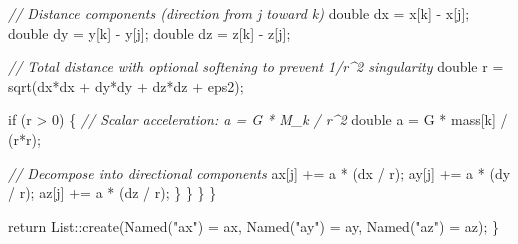 \documentclass[
  10.5pt,
  letterpaper,
]{scrbook}
\newenvironment{Shaded}{\begin{snugshade}}{\end{snugshade}}
\newcommand{\CommentTok}[1]{\textcolor[rgb]{0.00,0.00,0.00}{\textit{#1}}}
\newcommand{\ControlFlowTok}[1]{\textcolor[rgb]{0.00,0.00,0.00}{#1}}
\newcommand{\DataTypeTok}[1]{\textcolor[rgb]{0.00,0.00,0.00}{#1}}
\newcommand{\DecValTok}[1]{\textcolor[rgb]{0.00,0.00,0.00}{#1}}
\newcommand{\NormalTok}[1]{\textcolor[rgb]{0.00,0.00,0.00}{#1}}
\newcommand{\OperatorTok}[1]{\textcolor[rgb]{0.00,0.00,0.00}{#1}}
\newcommand{\StringTok}[1]{\textcolor[rgb]{0.00,0.00,0.00}{#1}}
\theoremstyle{definition}
\theoremstyle{plain}
\theoremstyle{remark}
\begin{document}
\begin{Shaded}
\begin{Highlighting}[]
        \CommentTok{// Distance components (direction from j toward k)}
        \DataTypeTok{double}\NormalTok{ dx }\OperatorTok{=}\NormalTok{ x}\OperatorTok{[}\NormalTok{k}\OperatorTok{]} \OperatorTok{{-}}\NormalTok{ x}\OperatorTok{[}\NormalTok{j}\OperatorTok{];}
        \DataTypeTok{double}\NormalTok{ dy }\OperatorTok{=}\NormalTok{ y}\OperatorTok{[}\NormalTok{k}\OperatorTok{]} \OperatorTok{{-}}\NormalTok{ y}\OperatorTok{[}\NormalTok{j}\OperatorTok{];}
        \DataTypeTok{double}\NormalTok{ dz }\OperatorTok{=}\NormalTok{ z}\OperatorTok{[}\NormalTok{k}\OperatorTok{]} \OperatorTok{{-}}\NormalTok{ z}\OperatorTok{[}\NormalTok{j}\OperatorTok{];}

        \CommentTok{// Total distance with optional softening to prevent 1/r\^{}2 singularity}
        \DataTypeTok{double}\NormalTok{ r }\OperatorTok{=}\NormalTok{ sqrt}\OperatorTok{(}\NormalTok{dx}\OperatorTok{*}\NormalTok{dx }\OperatorTok{+}\NormalTok{ dy}\OperatorTok{*}\NormalTok{dy }\OperatorTok{+}\NormalTok{ dz}\OperatorTok{*}\NormalTok{dz }\OperatorTok{+}\NormalTok{ eps2}\OperatorTok{);}

        \ControlFlowTok{if} \OperatorTok{(}\NormalTok{r }\OperatorTok{\textgreater{}} \DecValTok{0}\OperatorTok{)} \OperatorTok{\{}
          \CommentTok{// Scalar acceleration: a = G * M\_k / r\^{}2}
          \DataTypeTok{double}\NormalTok{ a }\OperatorTok{=}\NormalTok{ G }\OperatorTok{*}\NormalTok{ mass}\OperatorTok{[}\NormalTok{k}\OperatorTok{]} \OperatorTok{/} \OperatorTok{(}\NormalTok{r}\OperatorTok{*}\NormalTok{r}\OperatorTok{);}

          \CommentTok{// Decompose into directional components}
\NormalTok{          ax}\OperatorTok{[}\NormalTok{j}\OperatorTok{]} \OperatorTok{+=}\NormalTok{ a }\OperatorTok{*} \OperatorTok{(}\NormalTok{dx }\OperatorTok{/}\NormalTok{ r}\OperatorTok{);}
\NormalTok{          ay}\OperatorTok{[}\NormalTok{j}\OperatorTok{]} \OperatorTok{+=}\NormalTok{ a }\OperatorTok{*} \OperatorTok{(}\NormalTok{dy }\OperatorTok{/}\NormalTok{ r}\OperatorTok{);}
\NormalTok{          az}\OperatorTok{[}\NormalTok{j}\OperatorTok{]} \OperatorTok{+=}\NormalTok{ a }\OperatorTok{*} \OperatorTok{(}\NormalTok{dz }\OperatorTok{/}\NormalTok{ r}\OperatorTok{);}
        \OperatorTok{\}}
      \OperatorTok{\}}
    \OperatorTok{\}}
  \OperatorTok{\}}

  \ControlFlowTok{return}\NormalTok{ List}\OperatorTok{::}\NormalTok{create}\OperatorTok{(}\NormalTok{Named}\OperatorTok{(}\StringTok{"ax"}\OperatorTok{)} \OperatorTok{=}\NormalTok{ ax}\OperatorTok{,}\NormalTok{ Named}\OperatorTok{(}\StringTok{"ay"}\OperatorTok{)} \OperatorTok{=}\NormalTok{ ay}\OperatorTok{,}\NormalTok{ Named}\OperatorTok{(}\StringTok{"az"}\OperatorTok{)} \OperatorTok{=}\NormalTok{ az}\OperatorTok{);}
\OperatorTok{\}}
\end{Highlighting}
\end{Shaded}
\end{document}

